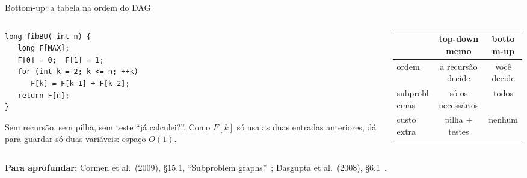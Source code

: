 \documentclass[aspectratio=169,xcolor=table]{beamer}
\newcommand{\fonte}[1]{%
  \vfill
  {\tiny\color{gray!55!black}\textbf{Para aprofundar:} #1\par}%
}
\begin{document}
\begin{frame}[fragile]{Bottom-up: a tabela na ordem do DAG}
  \begin{columns}[T]
    \begin{column}{0.47\textwidth}
\begin{lstlisting}
long fibBU( int n) {
   long F[MAX];
   F[0] = 0;  F[1] = 1;
   for (int k = 2; k <= n; ++k)
      F[k] = F[k-1] + F[k-2];
   return F[n];
}
\end{lstlisting}
      \scriptsize Sem recursão, sem pilha, sem teste ``já calculei?''. Como $F[k]$ só usa as
      duas entradas anteriores, dá para guardar só duas variáveis: espaço $O(1)$.
    \end{column}
    \begin{column}{0.49\textwidth}
      \centering
      \medskip

      \scriptsize
      \begin{tabular}{lcc}
        \toprule
        & top-down memo & bottom-up \\
        \midrule
        ordem & a recursão decide & você decide \\
        subproblemas & só os necessários & todos \\
        custo extra & pilha + testes & nenhum \\
        \bottomrule
      \end{tabular}
    \end{column}
  \end{columns}
  \fonte{Cormen et al.\ (2009), \S 15.1, ``Subproblem graphs''~\cite{cormen2009introduction};
    Dasgupta et al.\ (2008), \S 6.1~\cite{dasgupta2008algorithms}.}
\end{frame}
\end{document}
